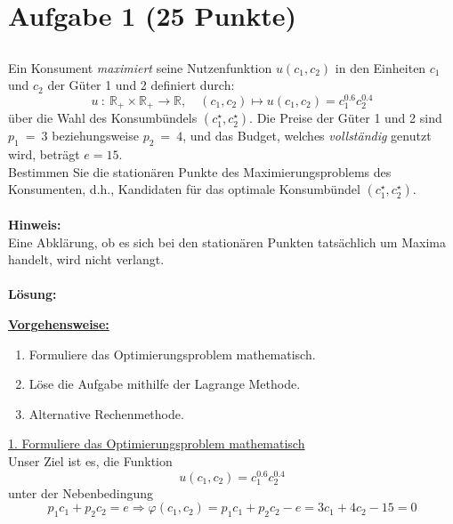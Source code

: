 \vspace{1cm}
\renewcommand{\labelenumi}{\theenumi.}
\section*{Aufgabe 1 (25 Punkte)}
\vspace{0.4cm}
\subsection*{}
Ein Konsument \textit{maximiert} seine Nutzenfunktion $u(c_1,c_2)$ in den Einheiten $c_1$ und $c_2$
der Güter 1 und 2 definiert durch:
\begin{equation*}
u \ : \ \mathbb{R}_+ \times \mathbb{R}_+ \to \mathbb{R},
\quad (c_1,c_2) \mapsto u(c_1,c_2) = c_1^{0.6} c_2^{0.4}
\end{equation*}
über die Wahl des Konsumbündels $(c_1^\star,c_2^\star)$.
Die Preise der Güter 1 und 2 sind $p_1 \ = \ 3$ beziehungsweise $p_2 \ = \ 4$,
und das Budget, welches \textit{vollständig} genutzt wird, beträgt $e = 15$.
\\
Bestimmen Sie die stationären Punkte des Maximierungsproblems des Konsumenten, 
d.h., Kandidaten für das optimale Konsumbündel $(c_1^\star,c_2^\star)$.
\\
\\
\textbf{Hinweis:}\\ 
Eine Abklärung, ob es sich bei den stationären Punkten tatsächlich um Maxima handelt, wird nicht verlangt.
\\
\\
\textbf{Lösung:}
\begin{mdframed}
\underline{\textbf{Vorgehensweise:}}
\renewcommand{\labelenumi}{\theenumi.}
\begin{enumerate}
\item Formuliere das Optimierungsproblem mathematisch.
\item Löse die Aufgabe mithilfe der Lagrange Methode.
\item Alternative Rechenmethode.
\end{enumerate}
\end{mdframed}
\underline{1. Formuliere das Optimierungsproblem mathematisch}\\
Unser Ziel ist es, die Funktion
\begin{equation*}
u(c_1,c_2) = c_1^{0.6}c_2^{0.4}
\end{equation*}
unter der Nebenbedingung
\begin{equation*}
p_1 c_1 + p_2 c_2 = e \Rightarrow
\varphi(c_1,c_2) = p_1 c_1 + p_2 c_2 - e = 3 c_1 + 4 c_2 - 15 = 0
\end{equation*}
